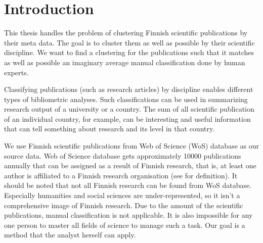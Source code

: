 \chapter{Introduction}
\label{chapter:intro}
This thesis handles the problem of clustering Finnish scientific 
publications by their meta data. The goal is to cluster 
them as well as possible by their scientific discipline. We want 
to find a clustering for the publications such that it matches 
as well as possible an imaginary average manual classification 
done by human experts.

Classifying publications (such as research articles) by discipline 
enables different types of bibliometric analyses. Such 
classifications can be used in summarizing research output of a 
university or a country. The sum of all scientific publication of 
an individual country, for example, can be interesting and useful 
information that can tell something about research and its level 
in that country.

We use Finnish scientific publications from  Web of Science (WoS)
database as our source data. 
Web of Science database gets approximately 10000 publications 
annually that can be assigned as a result of Finnish research, that
is, at least one author is affiliated to a Finnish research 
organisation (see \cite{auranen_tieteen_2018} for definition).
It should be noted that not all Finnish research can be found from
WoS database. Especially humanities and social sciences are 
under-represented, so it isn't a comprehensive image of Finnish 
research.
Due to the amount of the scientific publications, manual 
classification is not applicable. It is also impossible for any 
one person to master all fields of science to manage such a
task. Our goal is a method that the analyst herself can apply.

